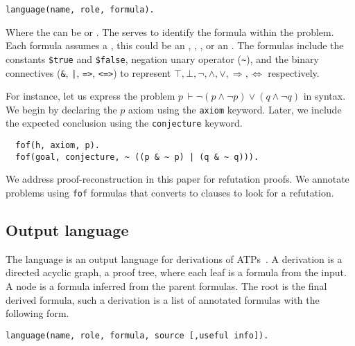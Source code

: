 \documentclass[../main.tex]{subfiles}
\begin{document}
\begin{verbatim}
language(name, role, formula).
\end{verbatim}

Where the  can be  or . The 
serves to identify the formula within the problem. Each formula
assumes a , this could be an ,
, ,  or an .
The formulas include the constants \verb!$true! and \verb!$false!, negation unary operator (\verb!~!), and the binary connectives (\verb!&!, \verb!|!, \verb!=>!, \verb!<=>!) to represent $⊤, ⊥, ¬, ∧, ∨, ⇒, ⇔$ respectively.

\begin{myexample}
For instance, let us express the problem
$p\, ⊢ ¬  (p ∧ ¬ p) ∨ (q ∧ ¬ q)$
in \TPTP syntax. We begin by declaring the $p$ axiom using the \verb!axiom!
keyword. Later, we include the expected conclusion using the
\verb!conjecture! keyword.

  \begin{verbatim}
  fof(h, axiom, p).
  fof(goal, conjecture, ~ ((p & ~ p) | (q & ~ q))).
  \end{verbatim}

\end{myexample}

\begin{remark}
We address proof-reconstruction in this paper for refutation proofs.
We annotate  problems using \verb!fof! formulas that
\Metis converts to  clauses to look for a refutation.
\end{remark}

\subsection{Output language}
\label{ssec:output-language}

The \TSTP language is an output language for derivations of
ATPs~\cite{Sutcliffe-Schulz-Claessen-VanGelder-2006,Sicard-Ramirez2016}.
A \TSTP derivation is a directed acyclic graph, a proof tree,
where each leaf is a formula from the \TPTP input. A node is a formula
inferred from the parent formulas. The root is the final derived formula,
such a derivation is a list of annotated formulas with the following form.

\begin{verbatim}
language(name, role, formula, source [,useful info]).
\end{verbatim}
\end{document}
